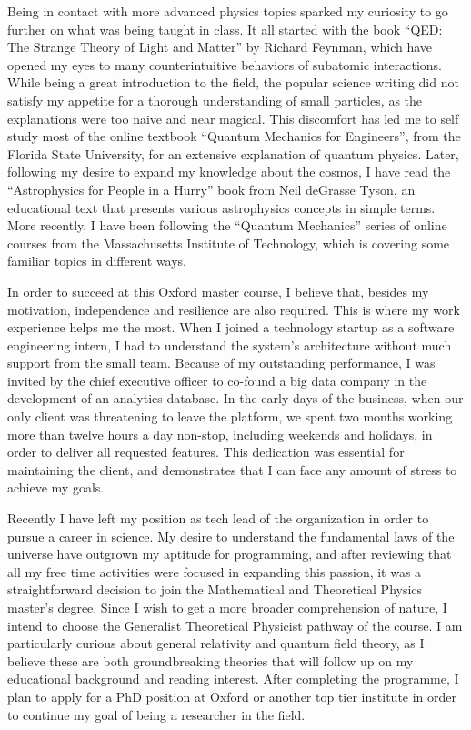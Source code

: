 \documentclass[11pt]{article}
\newcommand*{\NEWLINE}{\vspace{0.75em}}
\begin{document}
Being in contact with more advanced physics topics sparked my curiosity to go further on what was being taught in class. It all started with the book ``QED: The Strange Theory of Light and Matter'' by Richard Feynman, which have opened my eyes to many counterintuitive behaviors of subatomic interactions. While being a great introduction to the field, the popular science writing did not satisfy my appetite for a thorough understanding of small particles, as the explanations were too naive and near magical. This discomfort has led me to self study most of the online textbook ``Quantum Mechanics for Engineers'', from the Florida State University, for an extensive explanation of quantum physics. Later, following my desire to expand my knowledge about the cosmos, I have read the ``Astrophysics for People in a Hurry'' book from Neil deGrasse Tyson, an educational text that presents various astrophysics concepts in simple terms. More recently, I have been following the ``Quantum Mechanics'' series of online courses from the Massachusetts Institute of Technology, which is covering some familiar topics in different ways.
\NEWLINE{}

In order to succeed at this Oxford master course, I believe that, besides my motivation, independence and resilience are also required. This is where my work experience helps me the most. When I joined a technology startup as a software engineering intern, I had to understand the system's architecture without much support from the small team. Because of my outstanding performance, I was invited by the chief executive officer to co-found a big data company in the development of an analytics database. In the early days of the business, when our only client was threatening to leave the platform, we spent two months working more than twelve hours a day non-stop, including weekends and holidays, in order to deliver all requested features. This dedication was essential for maintaining the client, and demonstrates that I can face any amount of stress to achieve my goals. \NEWLINE{}

Recently I have left my position as tech lead of the organization in order to pursue a career in science. My desire to understand the fundamental laws of the universe have outgrown my aptitude for programming, and after reviewing that all my free time activities were focused in expanding this passion, it was a straightforward decision to join the Mathematical and Theoretical Physics master's degree. Since I wish to get a more broader comprehension of nature, I intend to choose the Generalist Theoretical Physicist pathway of the course. I am particularly curious about general relativity and quantum field theory, as I believe these are both groundbreaking theories that will follow up on my educational background and reading interest. After completing the programme, I plan to apply for a PhD position at Oxford or another top tier institute in order to continue my goal of being a researcher in the field.
\end{document}
